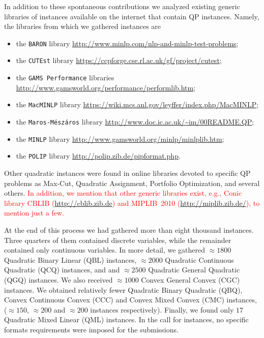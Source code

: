 In addition to these spontaneous contributions we analyzed existing generic
libraries of instances available  on the internet that contain QP
instances. Namely, the libraries from which we gathered instances are
%
\begin{itemize}
 \item the \texttt{BARON} library
 \url{http://www.minlp.com/nlp-and-minlp-test-problems};
%
\item the \texttt{CUTEst} library
 \url{https://ccpforge.cse.rl.ac.uk/gf/project/cutest};
%
\item the \texttt{GAMS Performance} libraries
 \url{http://www.gamsworld.org/performance/performlib.htm};
%
\item the \texttt{MacMINLP} library
 \url{https://wiki.mcs.anl.gov/leyffer/index.php/MacMINLP};
%
\item the \texttt{Maros-M{\'e}sz{\'a}ros} library
 \url{http://www.doc.ic.ac.uk/~im/00README.QP};
%
\item the \texttt{MINLP} library
 \url{http://www.gamsworld.org/minlp/minlplib.htm};
%
\item the \texttt{POLIP} library
 \url{http://polip.zib.de/pipformat.php}.
\end{itemize}

Other quadratic instances were found in online libraries devoted to
specific QP problems as Max-Cut, Quadratic Assignment, Portfolio
Optimization, and several others. \textcolor{red}{In addition, we mention
that other generic libraries exist, e.g., 
Conic library CBLIB (\url{http://cblib.zib.de}) and 
MIPLIB~2010 (\url{http://miplib.zib.de/}), to mention just a few.}

At the end of this process we had gathered more than eight thousand
instances. Three quarters of them contained discrete variables, while
the remainder contained only continuous variables. In more detail,
we gathered $\approx 1800$ Quadratic Binary Linear (QBL) instances,
$\approx 2000$ Quadratic Continuous Quadratic (QCQ) instances, and
and $\approx 2500$ Quadratic General Quadratic (QGQ) instances. We
also received $\approx 1000$ Convex General Convex (CGC) instances. We
obtained relatively fewer Quadratic Binary Quadratic (QBQ), Convex
Continuous Convex (CCC) and Convex Mixed Convex (CMC) instances,
($\approx 150$, $\approx 200$ and $\approx 200$ instances respectively).
Finally, we found only $17$ Quadratic Mixed
Linear (QML) instances. In the call for instances, no specific formats
requirements were imposed for the submissions.

